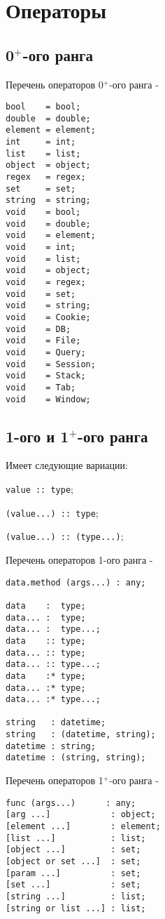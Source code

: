 \section{Операторы}

\subsection{0$^+$-ого ранга}

\noindent Перечень операторов 0$^+$-ого ранга -
\begin{lstlisting}[numbers=none]
bool    = bool;
double  = double;
element = element;
int     = int;
list    = list;
object  = object;
regex   = regex;
set     = set;
string  = string;
void    = bool;
void    = double;
void    = element;
void    = int;
void    = list;
void    = object;
void    = regex;
void    = set;
void    = string;
void    = Cookie;
void    = DB;
void    = File;
void    = Query;
void    = Session;
void    = Stack;
void    = Tab;
void    = Window;
\end{lstlisting}

\subsection{1-ого и 1$^+$-ого ранга}
Имеет следующие вариации:
\begin{icItems}
	\item \lstinline|value :: type|;
	\item \lstinline|(value...) :: type|;
	\item \lstinline|(value...) :: (type...)|;
\end{icItems}
\noindent Перечень операторов 1-ого ранга -
\begin{lstlisting}[numbers=none]
data.method (args...) : any;

data    :  type;
data... :  type;
data... :  type...;
data    :: type;
data... :: type;
data... :: type...;
data    :* type;
data... :* type;
data... :* type...;

string   : datetime;
string   : (datetime, string);
datetime : string;
datetime : (string, string);
\end{lstlisting}

\noindent Перечень операторов 1$^+$-ого ранга -
\begin{lstlisting}[numbers=none]
func (args...)      : any;
[arg ...]            : object;
[element ...]        : element;
[list ...]           : list;
[object ...]         : set;
[object or set ...]  : set;
[param ...]          : set;
[set ...]            : set;
[string ...]         : list;
[string or list ...] : list;
\end{lstlisting}

